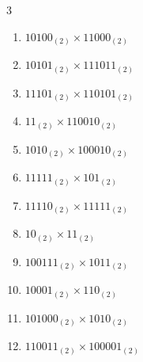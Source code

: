 \begin{multicols}{3}
\begin{enumerate}

  \item $10100_{(2)} \times 11000_{(2)}$


  \item $10101_{(2)} \times 111011_{(2)}$


  \item $11101_{(2)} \times 110101_{(2)}$


\columnbreak %

\resetques

  \item $11_{(2)} \times 110010_{(2)}$


  \item $1010_{(2)} \times 100010_{(2)}$


  \item $11111_{(2)} \times 101_{(2)}$


  \item $11110_{(2)} \times 11111_{(2)}$


  \item $10_{(2)} \times 11_{(2)}$


\columnbreak %

  \item $100111_{(2)} \times 1011_{(2)}$


  \item $10001_{(2)} \times 110_{(2)}$


  \item $101000_{(2)} \times 1010_{(2)}$


  \item $110011_{(2)} \times 100001_{(2)}$



\end{enumerate}
\end{multicols}
